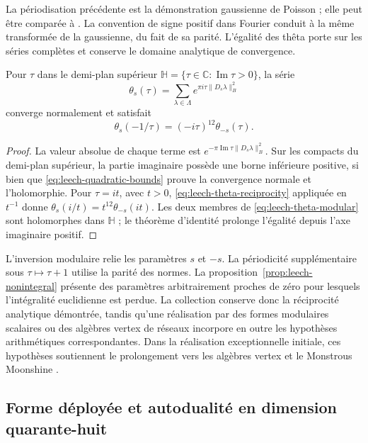 La périodisation précédente est la démonstration gaussienne de Poisson ;
elle peut être comparée à \cite[teorema 2, pp.~10--11]{Elkies}.
La convention de signe positif dans Fourier conduit à la même
transformée de la gaussienne, du fait de sa parité. L’égalité des thêta
porte sur les séries complètes et conserve le domaine analytique de
convergence.

\begin{proposition}
\label{prop:leech-theta-complex}
Pour \(\tau\) dans le demi-plan supérieur
\(\mathbb H=\{\tau\in\mathbb C:\operatorname{Im}\tau>0\}\), la série
\begin{equation}
 \theta_s(\tau)=\sum_{\lambda\in\Lambda}
             e^{\pi i\tau\|D_s\lambda\|_B^2}
 \label{eq:leech-theta-complex}
\end{equation}
converge normalement et satisfait
\begin{equation}
 \theta_s(-1/\tau)=(-i\tau)^{12}\theta_{-s}(\tau).
 \label{eq:leech-theta-modular}
\end{equation}
\end{proposition}
\begin{proof}
La valeur absolue de chaque terme est \(e^{-\pi\operatorname{Im}\tau\|D_s\lambda\|_B^2}\). Sur les compacts du demi-plan supérieur, la partie imaginaire possède une borne inférieure positive, si bien que \eqref{eq:leech-quadratic-bounds} prouve la convergence normale et l'holomorphie. Pour \(\tau=it\), avec \(t>0\), \eqref{eq:leech-theta-reciprocity} appliquée en \(t^{-1}\) donne \(\theta_s(i/t)=t^{12}\theta_{-s}(it)\). Les deux membres de \eqref{eq:leech-theta-modular} sont holomorphes dans \(\mathbb H\) ; le théorème d'identité prolonge l'égalité depuis l'axe imaginaire positif.
\end{proof}

L'inversion modulaire relie les paramètres \(s\) et \(-s\). La périodicité supplémentaire sous \(\tau\mapsto\tau+1\) utilise la parité des normes. La proposition~\ref{prop:leech-nonintegral} présente des paramètres arbitrairement proches de zéro pour lesquels l'intégralité euclidienne est perdue. La collection conserve donc la réciprocité analytique démontrée, tandis qu'une réalisation par des formes modulaires scalaires ou des algèbres vertex de réseaux incorpore en outre les hypothèses arithmétiques correspondantes. Dans la réalisation exceptionnelle initiale, ces hypothèses soutiennent le prolongement vers les algèbres vertex et le Monstrous Moonshine \cite{HMT-IV}.

\subsection{Forme déployée et autodualité en dimension quarante-huit}
\label{subsec:leech-split}

